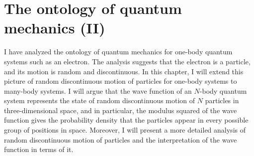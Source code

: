




\chapter{The ontology of quantum mechanics (II)}


I have analyzed the ontology of quantum mechanics for one-body quantum systems such as an electron.
The analysis suggests that the electron is a particle, and its motion is random and discontinuous. 
In this chapter, I will extend this picture of random discontinuous motion of particles for one-body systems to many-body systems.
I will argue that the wave function of an $N$-body quantum system represents the state of random discontinuous motion of $N$ particles in three-dimensional space, and in particular, the modulus squared of the wave function gives the probability density that the particles appear in every possible group of positions in space. 
Moreover, I will present a more detailed analysis of random discontinuous motion of particles and the interpretation of the wave function in terms of it.


